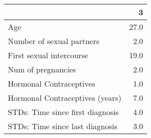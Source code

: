 \begin{tabular}{lr}
\toprule
{} &     3 \\
\midrule
Age                              &  27.0 \\
Number of sexual partners        &   2.0 \\
First sexual intercourse         &  19.0 \\
Num of pregnancies               &   2.0 \\
Hormonal Contraceptives          &   1.0 \\
Hormonal Contraceptives (years)  &   7.0 \\
STDs: Time since first diagnosis &   4.0 \\
STDs: Time since last diagnosis  &   3.0 \\
\bottomrule
\end{tabular}
